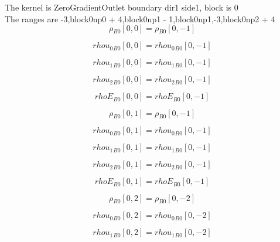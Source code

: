 \documentclass{article}
\begin{document}
\noindent The kernel is ZeroGradientOutlet boundary dir1 side1, block is 0\\\noindent The ranges are -3,block0np0 + 4,block0np1 - 1,block0np1,-3,block0np2 + 4\\\begin{dmath}{\rho{_{B0}}}[{0,0}] = {\rho{_{B0}}}[{0,-1}]\end{dmath}

\begin{dmath}{rhou_{0}{_{B0}}}[{0,0}] = {rhou_{0}{_{B0}}}[{0,-1}]\end{dmath}

\begin{dmath}{rhou_{1}{_{B0}}}[{0,0}] = {rhou_{1}{_{B0}}}[{0,-1}]\end{dmath}

\begin{dmath}{rhou_{2}{_{B0}}}[{0,0}] = {rhou_{2}{_{B0}}}[{0,-1}]\end{dmath}

\begin{dmath}{rhoE{_{B0}}}[{0,0}] = {rhoE{_{B0}}}[{0,-1}]\end{dmath}

\begin{dmath}{\rho{_{B0}}}[{0,1}] = {\rho{_{B0}}}[{0,-1}]\end{dmath}

\begin{dmath}{rhou_{0}{_{B0}}}[{0,1}] = {rhou_{0}{_{B0}}}[{0,-1}]\end{dmath}

\begin{dmath}{rhou_{1}{_{B0}}}[{0,1}] = {rhou_{1}{_{B0}}}[{0,-1}]\end{dmath}

\begin{dmath}{rhou_{2}{_{B0}}}[{0,1}] = {rhou_{2}{_{B0}}}[{0,-1}]\end{dmath}

\begin{dmath}{rhoE{_{B0}}}[{0,1}] = {rhoE{_{B0}}}[{0,-1}]\end{dmath}

\begin{dmath}{\rho{_{B0}}}[{0,2}] = {\rho{_{B0}}}[{0,-2}]\end{dmath}

\begin{dmath}{rhou_{0}{_{B0}}}[{0,2}] = {rhou_{0}{_{B0}}}[{0,-2}]\end{dmath}

\begin{dmath}{rhou_{1}{_{B0}}}[{0,2}] = {rhou_{1}{_{B0}}}[{0,-2}]\end{dmath}
\end{document}
